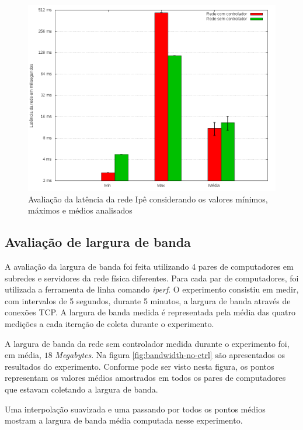 \begin{figure}[!htb]
    \centering
    \label{fig:ipe-latency-stats}
    \includegraphics[width=\linewidth]{img/ipe-latency-stats}
    \caption{Avaliação da latência da rede Ipê considerando os valores mínimos,
    máximos e médios analisados}
\end{figure}

\subsection{Avaliação de largura de banda}

A avaliação da largura de banda foi feita utilizando 4 pares de computadores
em subredes e servidores da rede física diferentes.
Para cada par de computadores, foi utilizada a ferramenta de linha comando
\emph{iperf}.
O experimento consistiu em medir, com intervalos de 5 segundos, durante 
5 minutos, a largura de banda através de conexões TCP.
A largura de banda medida é representada pela média das quatro medições a
cada iteração de coleta durante o experimento.

A largura de banda da rede sem controlador medida durante o experimento foi, 
em média, $18$ \emph{Megabytes}.
Na figura \ref{fig:bandwidth-no-ctrl} são apresentados os resultados do 
experimento. 
Conforme pode ser visto nesta figura, os pontos representam os valores 
médios amostrados em todos os pares de computadores que estavam coletando 
a largura de banda.

\break

Uma interpolação suavizada e uma passando por todos os pontos médios mostram
a largura de banda média computada nesse experimento.

